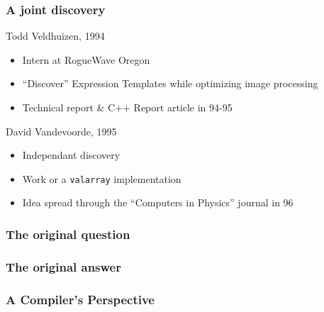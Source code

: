 
\begin{frame}
\frametitle{A joint discovery}
\begin{block}{Todd Veldhuizen, 1994}
\begin{itemize}
\item Intern at RogueWave Oregon
\item ``Discover'' Expression Templates while optimizing image processing
\item Technical report \& C++ Report article in 94-95
\end{itemize}
\end{block}{}

\begin{block}{David Vandevoorde, 1995}
\begin{itemize}
\item Independant discovery 
\item Work or a \texttt{valarray} implementation
\item Idea spread through the ``Computers in Physics'' journal in 96
\end{itemize}
\end{block}{}
\end{frame}

\begin{frame}
\frametitle{The original question}
\begin{center}\end{center}
\end{frame}

\begin{frame}
\frametitle{The original answer}
\begin{center}\end{center}
\end{frame}

\begin{frame}
\frametitle{A Compiler's Perspective}
\end{frame}

